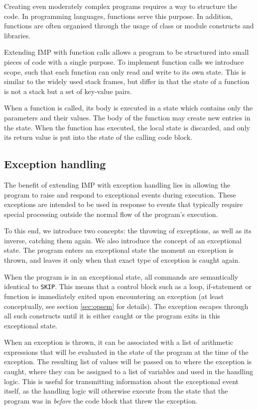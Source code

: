 Creating even moderately complex programs requires a way to structure the code. In programming languages, functions serve this purpose. In addition, functions are often organised through the usage of class or module constructs and libraries.

Extending IMP with function calls allows a program to be structured into small pieces of code with a single purpose. To implement function calls we introduce scope, such that each function can only read and write to its own state. This is similar to the widely used stack frames, but differ in that the state of a function is not a stack but a set of key-value pairs.

When a function is called, its body is executed in a state which contains only the parameters and their values. The body of the function may create new entries in the state. When the function has executed, the local state is discarded, and only its return value is put into the state of the calling code block.

\subsection{Exception handling}

The benefit of extending IMP with exception handling lies in allowing the program to raise and respond to exceptional events during execution. These exceptions are intended to be used in response to events that typically require special processing outside the normal flow of the program’s execution.

To this end, we introduce two concepts: the throwing of exceptions, as well as its inverse, catching them again. We also introduce the concept of an exceptional state. The program enters an exceptional state the moment an exception is thrown, and leaves it only when that exact type of exception is caught again.

When the program is in an exceptional state, all commands are semantically identical to \verb|SKIP|. This means that a control block such as a loop, if-statement or function is immediately exited upon encountering an exception (at least conceptually, see section \ref{sec:opsem}  for details). The exception escapes through all such constructs until it is either caught or the program exits in this exceptional state.

When an exception is thrown, it can be associated with a list of arithmetic expressions that will be evaluated in the state of the program at the time of the exception. The resulting list of values will be passed on to where the exception is caught, where they can be assigned to a list of variables and used in the handling logic. This is useful for transmitting information about the exceptional event itself, as the handling logic will otherwise execute from the state that the program was in \emph{before} the code block that threw the exception.